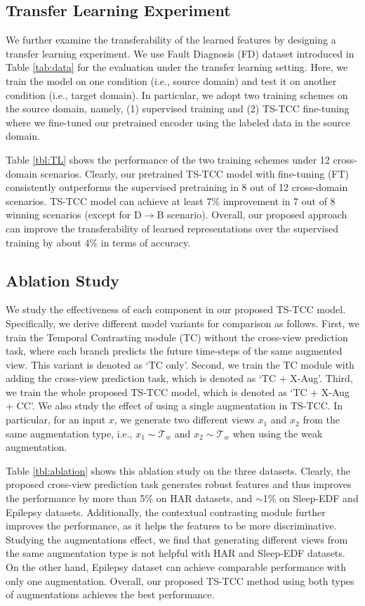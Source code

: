 \documentclass{article}
\begin{document}
 


\subsection{Transfer Learning Experiment}
We further examine the transferability of the learned features by designing a transfer learning experiment. We use Fault Diagnosis (FD) dataset introduced in Table \ref{tab:data} for the evaluation under the transfer learning setting. Here, we train the model on one condition (i.e., source domain) and test it on another condition (i.e., target domain). In particular, we adopt two training schemes on the source domain, namely, (1) supervised training and (2) TS-TCC fine-tuning where we fine-tuned our pretrained encoder using the labeled data in the source domain.  

Table \ref{tbl:TL} shows the performance of the two training schemes under 12 cross-domain scenarios. Clearly, our pretrained TS-TCC model with fine-tuning (FT) consistently outperforms the supervised pretraining in 8 out of 12 cross-domain scenarios. TS-TCC model can achieve at least 7\% improvement in 7 out of 8 winning scenarios (except for D$\rightarrow$B scenario). Overall, our proposed approach can improve the transferability of learned representations over the supervised training by about 4\% in terms of accuracy. 


\subsection{Ablation Study}
We study the effectiveness of each component in our proposed TS-TCC model.
Specifically, we derive different model variants for comparison as follows. First, we train the Temporal Contrasting module (TC) without the cross-view prediction task, where each branch predicts the future time-steps of the same augmented view. This variant is denoted as `TC only'. Second, we train the TC module with adding the cross-view prediction task, which is denoted as `TC + X-Aug'. Third, we train the whole proposed TS-TCC model, which is denoted as `TC + X-Aug + CC'. We also study the effect of using a single augmentation in TS-TCC. In particular, for an input $x$, we generate two different views $x_1$ and $x_2$ from the same augmentation type, i.e., $x_1 \!\sim\! \mathcal{T}_w$ and $x_2 \!\sim\! \mathcal{T}_w$ when using the weak augmentation.



Table \ref{tbl:ablation} shows this ablation study on the three datasets. 
Clearly, the proposed cross-view prediction task generates robust features and thus improves the performance by more than 5\% on HAR datasets, and $\sim$1\% on Sleep-EDF and Epilepsy datasets. Additionally, the contextual contrasting module further improves the performance, as it helps the features to be more discriminative. Studying the augmentations effect, we find that generating different views from the same augmentation type is not helpful with HAR and Sleep-EDF datasets. On the other hand, Epilepsy dataset can achieve comparable performance with only one augmentation. Overall, our proposed TS-TCC method using both types of augmentations achieves the best performance.
\end{document}
